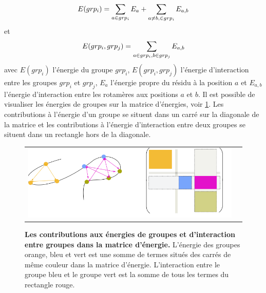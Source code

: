 \begin{equation}
E(grp_i) = \sum_{a \in grp_i}E_a + \sum_{a \neq b, \in grp_i}E_{a,b} \\
\end{equation}
et
\begin{equation}
E(grp_i,grp_j) = \sum_{a \in grp_i, b \in grp_j} E_{a,b} \\
\end{equation}
avec $E(grp_i)$ l'énergie du groupe $grp_i$, $E(grp_i,grp_j)$ l'énergie d'interaction entre les groupes $grp_i$ et $grp_j$, $E_a$ l'énergie propre du résidu à la position $a$ et $E_{a,b}$ l'énergie d'interaction entre les rotamères aux positions $a$ et $b$. Il est possible de visualiser les énergies de groupes sur la matrice d'énergies, voir \ref{fig:matrix_grp}. Les contributions à l'énergie d'un groupe se situent dans un carré sur la diagonale de la matrice et les contributions à l'énergie d'interaction entre deux groupes se situent dans un rectangle hors de la diagonale.


   \begin{figure}[!htbp]
     \centering
     \begin{tabular}{cc}
       \includegraphics[width=12cm]{figure/grp_matrix.png} &
     \end{tabular}
     
     \caption{\textbf{Les contributions aux énergies de groupes et d'interaction entre groupes dans la matrice d'énergie.} L'énergie des groupes orange, bleu et vert est une somme de termes situés des carrés de même couleur dans la matrice d'énergie. L'interaction entre le groupe bleu et le groupe vert est la somme de tous les termes du rectangle rouge.}
\label{fig:matrix_grp}
   \end{figure}
   

